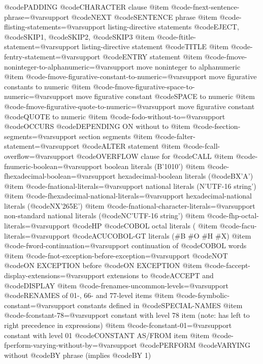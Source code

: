 @code{PADDING} @code{CHARACTER} clause
@item @code{-fnext-sentence-phrase=@var{support}}
@code{NEXT} @code{SENTENCE} phrase
@item @code{-flisting-statements=@var{support}}
listing-directive statements @code{EJECT}, @code{SKIP}1, @code{SKIP}2, @code{SKIP}3
@item @code{-ftitle-statement=@var{support}}
listing-directive statement @code{TITLE}
@item @code{-fentry-statement=@var{support}}
@code{ENTRY} statement
@item @code{-fmove-noninteger-to-alphanumeric=@var{support}}
move noninteger to alphanumeric
@item @code{-fmove-figurative-constant-to-numeric=@var{support}}
move figurative constants to numeric
@item @code{-fmove-figurative-space-to-numeric=@var{support}}
move figurative constant @code{SPACE} to numeric
@item @code{-fmove-figurative-quote-to-numeric=@var{support}}
move figurative constant @code{QUOTE} to numeric
@item @code{-fodo-without-to=@var{support}}
@code{OCCURS} @code{DEPENDING ON} without to
@item @code{-fsection-segments=@var{support}}
section segments
@item @code{-falter-statement=@var{support}}
@code{ALTER} statement
@item @code{-fcall-overflow=@var{support}}
@code{OVERFLOW} clause for @code{CALL}
@item @code{-fnumeric-boolean=@var{support}}
boolean literals (B'1010')
@item @code{-fhexadecimal-boolean=@var{support}}
hexadecimal-boolean literals (@code{BX}'A')
@item @code{-fnational-literals=@var{support}}
national literals (N'UTF-16 string')
@item @code{-fhexadecimal-national-literals=@var{support}}
hexadecimal-national literals (@code{NX}'265E')
@item @code{-fnational-character-literals=@var{support}}
non-standard national literals (@code{NC}'UTF-16 string')
@item @code{-fhp-octal-literals=@var{support}}
@code{HP} @code{COBOL} octal literals (%
@item @code{-facu-literals=@var{support}}
@code{ACUCOBOL-GT} literals (#B #O #H #X)
@item @code{-fword-continuation=@var{support}}
continuation of @code{COBOL} words
@item @code{-fnot-exception-before-exception=@var{support}}
@code{NOT} @code{ON EXCEPTION} before @code{ON EXCEPTION}
@item @code{-faccept-display-extensions=@var{support}}
extensions to @code{ACCEPT} and @code{DISPLAY}
@item @code{-frenames-uncommon-levels=@var{support}}
@code{RENAMES} of 01-, 66- and 77-level items
@item @code{-fsymbolic-constant=@var{support}}
constants defined in @code{SPECIAL-NAMES}
@item @code{-fconstant-78=@var{support}}
constant with level 78 item (note: has left to right precedence in expressions)
@item @code{-fconstant-01=@var{support}}
constant with level 01 @code{CONSTANT AS}/FROM item
@item @code{-fperform-varying-without-by=@var{support}}
@code{PERFORM} @code{VARYING} without @code{BY} phrase (implies @code{BY} 1)
